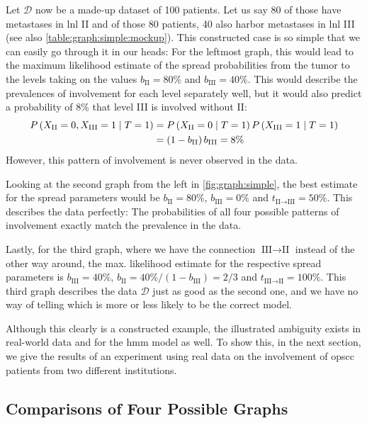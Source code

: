 \documentclass[\relativeRoot/main.tex]{subfiles}
\begin{document}
Let $\boldsymbol{\mathcal{D}}$ now be a made-up dataset of 100 patients. Let us say 80 of those have metastases in \gls{lnl} II and of those 80 patients, 40 also harbor metastases in \gls{lnl} III (see also \cref{table:graph:simple:mockup}). This constructed case is so simple that we can easily go through it in our heads: For the leftmost graph, this would lead to the maximum likelihood estimate of the spread probabilities from the tumor to the levels taking on the values $b_\text{II} = 80\%$ and $b_\text{III} = 40\%$. This would describe the prevalences of involvement for each level separately well, but it would also predict a probability of 8\% that level III is involved without II:
%
\begin{equation}
    \begin{aligned}
        P \left( X_\text{II}=0, X_\text{III}=1 \mid T=1 \right) &= P \left( X_\text{II}=0 \mid T=1 \right) P \left( X_\text{III}=1 \mid T=1 \right) \\
        &= \left( 1 - b_\text{II} \right) b_\text{III} = 8\%
    \end{aligned}
\end{equation}
%
However, this pattern of involvement is never observed in the data.

Looking at the second graph from the left in \cref{fig:graph:simple}, the best estimate for the spread parameters would be $b_\text{II} = 80\%$, $b_\text{III} = 0\%$ and $t_{\text{II} \rightarrow \text{III}} = 50\%$. This describes the data perfectly: The probabilities of all four possible patterns of involvement exactly match the prevalence in the data.

Lastly, for the third graph, where we have the connection $\text{III} \rightarrow \text{II}$ instead of the other way around, the max. likelihood estimate for the respective spread parameters is $b_\text{III} = 40\%$, $b_\text{II} = 40\% / (1 - b_\text{III}) = 2/3$ and $t_{\text{III} \rightarrow \text{II}} = 100\%$. This third graph describes the data $\boldsymbol{\mathcal{D}}$ just as good as the second one, and we have no way of telling which is more or less likely to be the correct model.

Although this clearly is a constructed example, the illustrated ambiguity exists in real-world data and for the \gls{hmm} model as well. To show this, in the next section, we give the results of an experiment using real data on the involvement of \gls{opscc} patients from two different institutions.

\clearpage

\subsection{Comparisons of Four Possible Graphs}
\label{subsec:graph:simple:comp}
\end{document}
